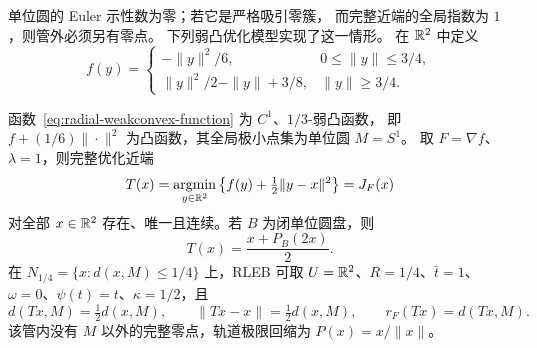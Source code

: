 单位圆的 Euler 示性数为零；若它是严格吸引零簇，
而完整近端的全局指数为 $1$，则管外必须另有零点。
下列弱凸优化模型实现了这一情形。
在 $\mathbb R^2$ 中定义
\begin{equation}
\label{eq:radial-weakconvex-function}
 f(y)=
 \begin{cases}
 -\|y\|^2/6,&0\le\|y\|\le3/4,\\
 \|y\|^2/2-\|y\|+3/8,&\|y\|\ge3/4.
 \end{cases}
\end{equation}

\begin{proposition}
\label{prop:circle-origin-model}
函数~\eqref{eq:radial-weakconvex-function} 为 $C^1$、$1/3$-弱凸函数，
即 $f+(1/6)\|\cdot\|^2$ 为凸函数，其全局极小点集为单位圆 $M=S^1$。
取 $F=\nabla f$、$\lambda=1$，则完整优化近端
\[
 T(x)=\underset{y\in\mathbb R^2}{\operatorname{argmin}}
       \left\{f(y)+\tfrac12\|y-x\|^2\right\}=J_F(x)
\]
对全部 $x\in\mathbb R^2$ 存在、唯一且连续。若 $B$ 为闭单位圆盘，则
\begin{equation}
\label{eq:radial-proximal-map}
 T(x)=\frac{x+P_B(2x)}2.
\end{equation}
在 $N_{1/4}=\{x:d(x,M)\le1/4\}$ 上，RLEB 可取
$U=\mathbb R^2$、$R=1/4$、$\bar t=1$、$\omega=0$、$\psi(t)=t$、$\kappa=1/2$，且
\begin{equation}
\label{eq:circle-exact-local-estimates}
 d(Tx,M)=\tfrac12d(x,M),\qquad
 \|Tx-x\|=\tfrac12d(x,M),\qquad
 r_F(Tx)=d(Tx,M).
\end{equation}
该管内没有 $M$ 以外的完整零点，轨道极限回缩为 $P(x)=x/\|x\|$。
\end{proposition}

